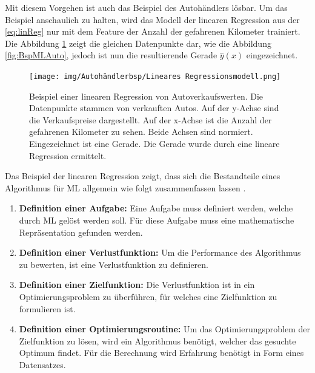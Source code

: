 Mit diesem Vorgehen ist auch das Beispiel des Autohändlers lösbar. Um das Beispiel anschaulich zu halten, wird das Modell der linearen Regression aus der \autoref{eq:linReg} nur mit dem \gls{Feature} der Anzahl der gefahrenen Kilometer trainiert. Die Abbildung \ref{fig:BspMLAutoMitReg} zeigt die gleichen Datenpunkte dar, wie die Abbildung \ref{fig:BspMLAuto}, jedoch ist nun die resultierende Gerade \(\hat{y}(x)\) eingezeichnet. 

\begin{figure}[htb]
    \centering
    \texttt{[image: img/Autohändlerbsp/Lineares Regressionsmodell.png]}
    \caption[Beispiel einer linearen Regression von Autoverkaufswerten.]{Beispiel einer linearen Regression von Autoverkaufswerten. Die Datenpunkte stammen von verkauften Autos. Auf der y-Achse sind die Verkaufspreise dargestellt. Auf der x-Achse ist die Anzahl der gefahrenen Kilometer zu sehen. Beide Achsen sind normiert. Eingezeichnet ist eine Gerade. Die Gerade wurde durch eine lineare Regression ermittelt.}
    \label{fig:BspMLAutoMitReg}
\end{figure}

\begin{samepage}
Das Beispiel der linearen Regression zeigt, dass sich die Bestandteile eines Algorithmus für \gls{ML} allgemein wie folgt zusammenfassen lassen \cite{Burkov.2019, Mitchell.1997, Goodfellow.2016}.

\begin{enumerate}
    \item \textbf{Definition einer Aufgabe:} Eine Aufgabe muss definiert werden, welche durch \gls{ML} gelöst werden soll. Für diese Aufgabe muss eine mathematische Repräsentation gefunden werden.
    \item \textbf{Definition einer \gls{Verlustfunktion}:} Um die Performance des Algorithmus zu bewerten, ist eine \gls{Verlustfunktion} zu definieren.
    \item \textbf{Definition einer \gls{Zielfunktion}:} Die \gls{Verlustfunktion} ist in ein Optimierungsproblem zu überführen, für welches eine \gls{Zielfunktion} zu formulieren ist.
    \item \textbf{Definition einer Optimierungsroutine:} Um das Optimierungsproblem der \gls{Zielfunktion} zu lösen, wird ein Algorithmus benötigt, welcher das gesuchte Optimum findet. Für die Berechnung wird Erfahrung benötigt in Form eines Datensatzes.
\end{enumerate}
\end{samepage}


